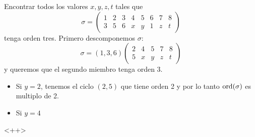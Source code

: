 \begin{ej} %
    Encontrar todos los valores $x, y, z, t$ tales que 
    \[
        \sigma =
        \begin{pmatrix}
            1 & 2 & 3 & 4 & 5 & 6 & 7 & 8 \\
            3 & 5 & 6 & x & y & 1 & z & t
        \end{pmatrix}
    \]
    tenga orden tres.
    Primero descomponemos $\sigma$:
    \[
        \sigma = (1, 3, 6)
        \begin{pmatrix}
            2 & 4 & 5 & 7 & 8 \\
            5 & x & y & z & t
        \end{pmatrix}
    \]
    y queremos que el segundo miembro tenga orden 3.

    \begin{itemize}
        \item Si $y = 2$, tenemos el ciclo $(2, 5)$ que tiene orden 2 y por lo tanto $\operatorname{ord}(\sigma)$
            es multiplo de 2.
        \item Si $y = 4$ 
    \end{itemize}<++>
\end{ej}
